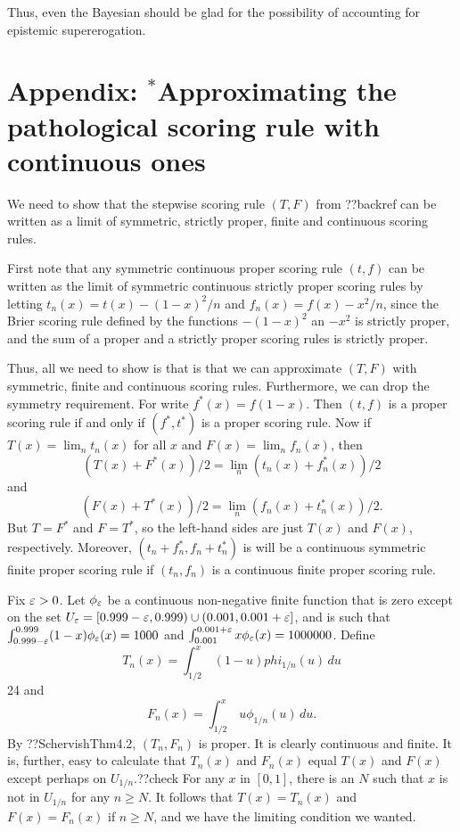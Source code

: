Thus, even the Bayesian should be glad for the possibility of accounting for epistemic supererogation.

\section*{Appendix: $^*$Approximating the pathological scoring rule with continuous ones}
We need to show that the stepwise scoring rule $(T,F)$ from ??backref can be written as a limit of
symmetric, strictly proper, finite and continuous scoring rules. 

First note that any symmetric continuous proper scoring rule $(t,f)$ can be written as the limit of symmetric continuous
strictly proper scoring rules by letting $t_n(x)=t(x)-(1-x)^2/n$ and $f_n(x)=f(x)-x^2/n$, since the Brier scoring rule defined
by the functions $-(1-x)^2$ an $-x^2$ is strictly proper, and the sum of a proper and a strictly proper scoring rules is
strictly proper. 

Thus, all we need to show is that is that we can approximate $(T,F)$ with symmetric, finite and continuous scoring rules.
Furthermore, we can drop the symmetry requirement. For write $f^*(x)=f(1-x)$. Then $(t,f)$ is a proper scoring rule if and
only if $(f^*,t^*)$ is a proper scoring rule. Now if $T(x)=\lim_n t_n(x)$ for all $x$ and $F(x)=\lim_n f_n(x)$, then
$$
    (T(x)+F^*(x))/2 = \lim_n (t_n(x)+f_n^*(x))/2
$$    
    and
$$    
    (F(x)+T^*(x))/2 = \lim_n (f_n(x)+t_n^*(x))/2. 
$$    
But $T=F^*$ and $F=T^*$, so the left-hand sides are just $T(x)$ and $F(x)$, respectively. Moreover, $(t_n+f_n^*,f_n+t_n^*)$ is 
will be a continuous symmetric finite proper scoring rule if $(t_n,f_n)$ is a continuous finite proper scoring rule.

Fix $\varepsilon>0$. Let $\phi_\varepsilon$ be a continuous non-negative finite function that is zero except on the set $U_\varepsilon=[0.999-\varepsilon,0.999)\cup (0.001,0.001+\varepsilon]$, 
and is such that $\int_{0.999-\varepsilon}^{0.999} (1-x) \phi_\varepsilon(x) = 1000$ and $\int_{0.001}^{0.001+\varepsilon} x \phi_\varepsilon(x) = 1000000$. 
Define 
$$
    T_n(x) = \int_{1/2}^x \, (1-u)phi_{1/n}(u) \, du
$$24
and 
$$
    F_n(x) = \int_{1/2}^x \, u \phi_{1/n}(u) \, du.
$$
By ??SchervishThm4.2, $(T_n,F_n)$ is proper. It is clearly continuous and finite. It is, further, easy to calculate that 
$T_n(x)$ and $F_n(x)$ equal $T(x)$ and $F(x)$ except perhaps on $U_{1/n}$.??check For any $x$ in $[0,1]$, there is an $N$
such that $x$ is not in $U_{1/n}$ for any $n\ge N$. It follows that $T(x)=T_n(x)$ and $F(x)=F_n(x)$ if $n\ge N$, and we have
the limiting condition we wanted.

\chaptertail 


